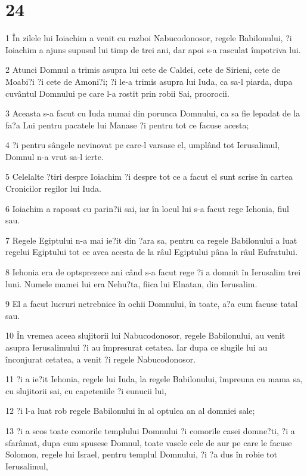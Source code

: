 \chapter{24}

\par 1 În zilele lui Ioiachim a venit cu razboi Nabucodonosor, regele Babilonului, ?i Ioiachim a ajuns supusul lui timp de trei ani, dar apoi s-a rasculat împotriva lui.
\par 2 Atunci Domnul a trimis asupra lui cete de Caldei, cete de Sirieni, cete de Moabi?i ?i cete de Amoni?i; ?i le-a trimis asupra lui Iuda, ca sa-l piarda, dupa cuvântul Domnului pe care l-a rostit prin robii Sai, proorocii.
\par 3 Aceasta s-a facut cu Iuda numai din porunca Domnului, ca sa fie lepadat de la fa?a Lui pentru pacatele lui Manase ?i pentru tot ce facuse acesta;
\par 4 ?i pentru sângele nevinovat pe care-l varsase el, umplând tot Ierusalimul, Domnul n-a vrut sa-l ierte.
\par 5 Celelalte ?tiri despre Ioiachim ?i despre tot ce a facut el sunt scrise în cartea Cronicilor regilor lui Iuda.
\par 6 Ioiachim a raposat cu parin?ii sai, iar în locul lui s-a facut rege Iehonia, fiul sau.
\par 7 Regele Egiptului n-a mai ie?it din ?ara sa, pentru ca regele Babilonului a luat regelui Egiptului tot ce avea acesta de la râul Egiptului pâna la râul Eufratului.
\par 8 Iehonia era de optsprezece ani când s-a facut rege ?i a domnit în Ierusalim trei luni. Numele mamei lui era Nehu?ta, fiica lui Elnatan, din Ierusalim.
\par 9 El a facut lucruri netrebnice în ochii Domnului, în toate, a?a cum facuse tatal sau.
\par 10 În vremea aceea slujitorii lui Nabucodonosor, regele Babilonului, au venit asupra Ierusalimului ?i au împresurat cetatea. Iar dupa ce slugile lui au înconjurat cetatea, a venit ?i regele Nabucodonosor.
\par 11 ?i a ie?it Iehonia, regele lui Iuda, la regele Babilonului, împreuna cu mama sa, cu slujitorii sai, cu capeteniile ?i eunucii lui,
\par 12 ?i l-a luat rob regele Babilonului în al optulea an al domniei sale;
\par 13 ?i a scos toate comorile templului Domnului ?i comorile casei domne?ti, ?i a sfarâmat, dupa cum spusese Domnul, toate vasele cele de aur pe care le facuse Solomon, regele lui Israel, pentru templul Domnului, ?i ?a dus în robie tot Ierusalimul,
